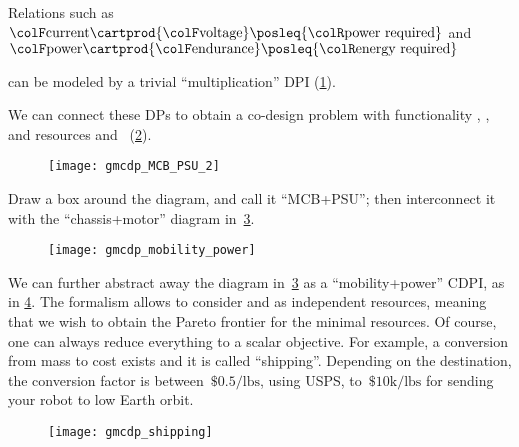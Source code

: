 \begin{example}

	Relations such as ${\colF\mbox{current}}\cartprod{\colF\mbox{voltage}}\posleq{\colR\mbox{power required}}$
	and ${\colF\mbox{power}}\cartprod{\colF\mbox{endurance}}\posleq{\colR\mbox{energy required}}$

	can be modeled by a trivial ``multiplication'' DPI (\cref{fig:current_times_voltage}).

	\begin{figure}[h!]
		\centering
		\caption{}
		\label{fig:current_times_voltage}
	\end{figure}


	We can connect these DPs to obtain a co-design problem with functionality , ,  and resources  and ~(\cref{fig:connect}).

	\begin{figure}[h!]
		\centering
		\texttt{[image: gmcdp\_MCB\_PSU\_2]}
		\caption{}
		\label{fig:connect}
	\end{figure}


	Draw a box around the diagram, and call it ``MCB+PSU'';
	then interconnect it with the ``chassis+motor'' diagram in~\cref{fig:another}.

	\begin{figure}[h!]
		\centering
		\texttt{[image: gmcdp\_mobility\_power]}
		\caption{}
		\label{fig:another}
	\end{figure}

	We can further abstract away the diagram in~\cref{fig:another} as a ``mobility+power'' CDPI, as in \cref{fig:shipping}.
	The formalism allows to consider  and  as independent resources, meaning that we wish to obtain the Pareto frontier for the minimal resources.
	Of course, one can always reduce everything to a scalar objective.
	For example, a conversion from mass to cost exists and it is called ``shipping''.
	Depending on the destination, the conversion factor is between~$\$0.5/\mbox{lbs}$, using USPS, to~$\$10\mbox{k}/\mbox{lbs}$ for sending your robot to low Earth orbit.

	\begin{figure}[h!]
		\centering{}
		\texttt{[image: gmcdp\_shipping]}
		\caption{}
		\label{fig:shipping}
	\end{figure}

\end{example}

